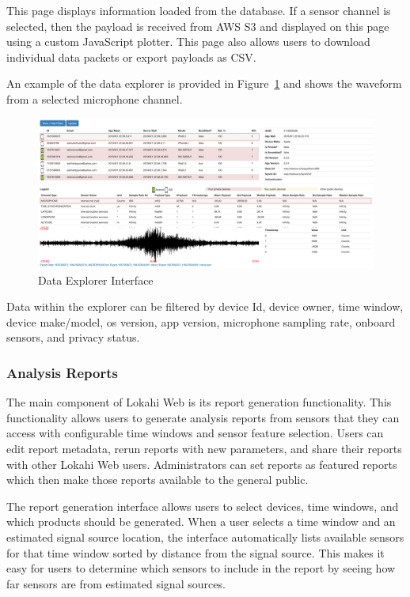 This page displays information loaded from the database. If a sensor channel is selected, then the payload is received from AWS S3 and displayed on this page using a custom JavaScript plotter. This page also allows users to download individual data packets or export payloads as CSV\@.

An example of the data explorer is provided in Figure~\ref{fig:lweb_dataexplorer} and shows the waveform from a selected microphone channel.

\begin{figure}
	\centering
	\includegraphics[width=0.7\linewidth]{figures/lweb_dataexplorer.png}
	\caption{Data Explorer Interface}
	\label{fig:lweb_dataexplorer}
\end{figure}

Data within the explorer can be filtered by device Id, device owner, time window, device make/model, os version, app version, microphone sampling rate, onboard sensors, and privacy status.

\subsubsection{Analysis Reports}
The main component of Lokahi Web is its report generation functionality. This functionality allows users to generate analysis reports from sensors that they can access with configurable time windows and sensor feature selection. Users can edit report metadata, rerun reports with new parameters, and share their reports with other Lokahi Web users. Administrators can set reports as featured reports which then make those reports available to the general public.

The report generation interface allows users to select devices, time windows, and which products should be generated. When a user selects a time window and an estimated signal source location, the interface automatically lists available sensors for that time window sorted by distance from the signal source. This makes it easy for users to determine which sensors to include in the report by seeing how far sensors are from estimated signal sources.

